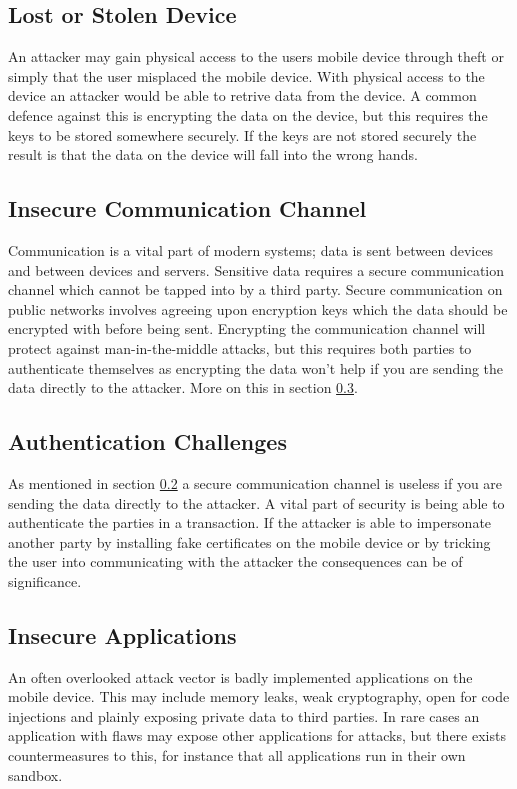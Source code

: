 \subsection{Lost or Stolen Device}
An attacker may gain physical access to the users mobile device through theft or simply that the user misplaced the mobile device. With physical access to the device an attacker would be able to retrive data from the device. A common defence against this is encrypting the data on the device, but this requires the keys to be stored somewhere securely. If the keys are not stored securely the result is that the data on the device will fall into the wrong hands.

\subsection{Insecure Communication Channel}
\label{sec:unsecureCommunication}
Communication is a vital part of modern systems; data is sent between devices and between devices and servers. Sensitive data requires a secure communication channel which cannot be tapped into by a third party. Secure communication on public networks involves agreeing upon encryption keys which the data should be encrypted with before being sent. Encrypting the communication channel will protect against man-in-the-middle attacks, but this requires both parties to authenticate themselves as encrypting the data won't help if you are sending the data directly to the attacker. More on this in section \ref{sec:authenticationChallenges}.

\subsection{Authentication Challenges}
\label{sec:authenticationChallenges}
As mentioned in section \ref{sec:unsecureCommunication} a secure communication channel is useless if you are sending the data directly to the attacker. A vital part of security is being able to authenticate the parties in a transaction. If the attacker is able to impersonate another party by installing fake certificates on the mobile device or by tricking the user into communicating with the attacker the consequences can be of significance.

\subsection{Insecure Applications}
An often overlooked attack vector is badly implemented applications on the mobile device. This may include memory leaks, weak cryptography, open for code injections and plainly exposing private data to third parties. In rare cases an application with flaws may expose other applications for attacks, but there exists countermeasures to this, for instance that all applications run in their own sandbox.
